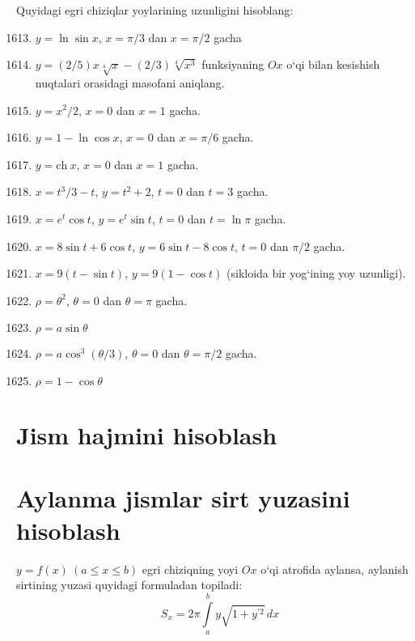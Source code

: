 Quyidagi egri chiziqlar yoylarining uzunligini hisoblang:
\begin{enumerate}\setcounter{enumi}{1612}
\item $y=\ln\sin x$, $x=\pi/3$ dan $x=\pi/2$ gacha

\item $y=(2/5)x\sqrt[4]{x}-(2/3)\sqrt[4]{x^3}$ funksiyaning $Ox$ o`qi bilan kesishish nuqtalari orasidagi masofani aniqlang.

\item $y=x^2/2$, $x=0$ dan $x=1$ gacha.

\item $y=1-\ln\cos x$, $x=0$ dan $x=\pi/6$ gacha.

\item $y=\textrm{ch}\ x$, $x=0$ dan $x=1$ gacha.

\item $x=t^3/3-t$, $y=t^2+2$, $t=0$ dan $t=3$ gacha.

\item $x=e^t \cos t$, $y=e^t \sin t$, $t=0$ dan $t=\ln\pi$ gacha.

\item $x=8\sin t+6\cos t$, $y=6\sin t-8\cos t$, $t=0$ dan $\pi/2$ gacha.

\item $x=9(t-\sin t)$, $y=9(1-\cos t)$ (sikloida bir yog`ining yoy uzunligi).

\item $\rho=\theta^2$, $\theta=0$ dan $\theta=\pi$ gacha.

\item $\rho=a\sin\theta$

\item $\rho=a\cos^3(\theta/3)$, $\theta=0$ dan $\theta=\pi/2$ gacha.

\item $\rho=1-\cos\theta$
\end{enumerate}

\section{Jism hajmini hisoblash}











\section{Aylanma jismlar sirt yuzasini hisoblash}
$y=f(x)\ (a\le x\le b)$ egri chiziqning yoyi $Ox$ o`qi atrofida aylansa, aylanish sirtining yuzasi quyidagi formuladan topiladi:
$$S_{x}=2\pi\int\limits_a^b y\sqrt{1+y^{\prime 2}}\,dx$$

